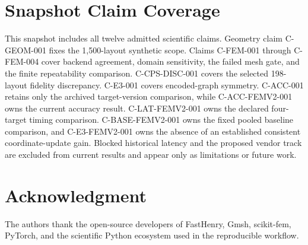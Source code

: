 \documentclass[journal]{IEEEtran}
\begin{document}
\section{Snapshot Claim Coverage}
This snapshot includes all twelve admitted scientific claims. Geometry claim
C-GEOM-001 fixes the 1,500-layout synthetic scope. Claims C-FEM-001 through
C-FEM-004 cover backend agreement, domain sensitivity, the failed mesh gate,
and the finite repeatability comparison. C-CPS-DISC-001 covers the selected
198-layout fidelity discrepancy. C-E3-001 covers encoded-graph symmetry.
C-ACC-001 retains only the archived target-version comparison, while
C-ACC-FEMV2-001 owns the current accuracy result. C-LAT-FEMV2-001 owns the
declared four-target timing comparison. C-BASE-FEMV2-001 owns the fixed pooled
baseline comparison, and C-E3-FEMV2-001 owns the absence of an established
consistent coordinate-update gain. Blocked historical latency and the proposed
vendor track are excluded from current results and appear only as limitations
or future work.

\section*{Acknowledgment}
The authors thank the open-source developers of FastHenry, Gmsh, scikit-fem, PyTorch, and the scientific Python ecosystem used in the reproducible workflow.



\end{document}
